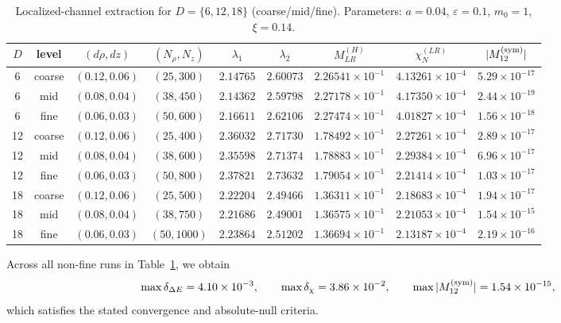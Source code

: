 \documentclass[aps,prd,onecolumn,notitlepage,nofootinbib,superscriptaddress,11pt,floatfix]{revtex4-2}
\begin{document}
\begin{table}[t]
\centering
\caption{Localized-channel extraction for $D=\{6,12,18\}$ (coarse/mid/fine). Parameters: $a=0.04$, $\varepsilon=0.1$, $m_0=1$, $\xi=0.14$.}
\label{tab:chi_loc}
\begin{tabular}{ccccccccc}
\hline\hline
$D$ & level & $(d\rho,dz)$ & $(N_\rho,N_z)$ & $\lambda_1$ & $\lambda_2$ & $M_{LR}^{(H)}$ & $\chi_N^{(LR)}$ & $|M_{12}^{\rm(sym)}|$ \\
\hline
6  & coarse & $(0.12,0.06)$ & $(25,300)$  & $2.14765$ & $2.60073$ & $2.26541\times10^{-1}$ & $4.13261\times10^{-4}$ & $5.29\times10^{-17}$ \\
6  & mid    & $(0.08,0.04)$ & $(38,450)$  & $2.14362$ & $2.59798$ & $2.27178\times10^{-1}$ & $4.17350\times10^{-4}$ & $2.44\times10^{-19}$ \\
6  & fine   & $(0.06,0.03)$ & $(50,600)$  & $2.16611$ & $2.62106$ & $2.27474\times10^{-1}$ & $4.01827\times10^{-4}$ & $1.56\times10^{-18}$ \\
12 & coarse & $(0.12,0.06)$ & $(25,400)$  & $2.36032$ & $2.71730$ & $1.78492\times10^{-1}$ & $2.27261\times10^{-4}$ & $2.89\times10^{-17}$ \\
12 & mid    & $(0.08,0.04)$ & $(38,600)$  & $2.35598$ & $2.71374$ & $1.78883\times10^{-1}$ & $2.29384\times10^{-4}$ & $6.96\times10^{-17}$ \\
12 & fine   & $(0.06,0.03)$ & $(50,800)$  & $2.37821$ & $2.73632$ & $1.79054\times10^{-1}$ & $2.21414\times10^{-4}$ & $1.03\times10^{-17}$ \\
18 & coarse & $(0.12,0.06)$ & $(25,500)$  & $2.22204$ & $2.49466$ & $1.36311\times10^{-1}$ & $2.18683\times10^{-4}$ & $1.94\times10^{-17}$ \\
18 & mid    & $(0.08,0.04)$ & $(38,750)$  & $2.21686$ & $2.49001$ & $1.36575\times10^{-1}$ & $2.21053\times10^{-4}$ & $1.54\times10^{-15}$ \\
18 & fine   & $(0.06,0.03)$ & $(50,1000)$ & $2.23864$ & $2.51202$ & $1.36694\times10^{-1}$ & $2.13187\times10^{-4}$ & $2.19\times10^{-16}$ \\
\hline\hline
\end{tabular}
\end{table}

Across all non-fine runs in Table~\ref{tab:chi_loc}, we obtain
\begin{equation}
\max \delta_{\Delta E}=4.10\times10^{-3},\qquad
\max \delta_{\chi}=3.86\times10^{-2},\qquad
\max |M_{12}^{\rm(sym)}|=1.54\times10^{-15},
\end{equation}
which satisfies the stated convergence and absolute-null criteria.
\end{document}
